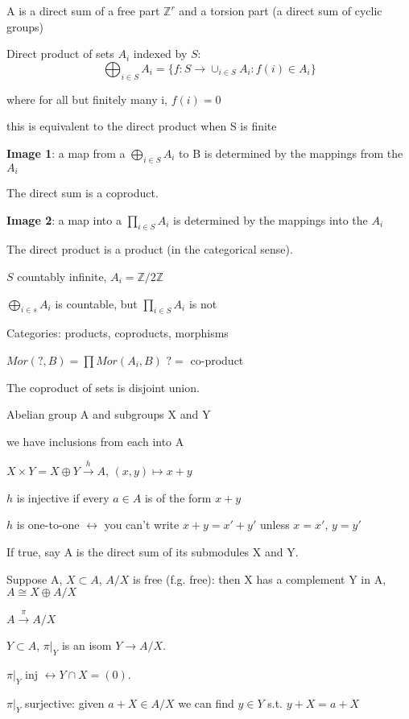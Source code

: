 \documentclass[12pt]{article}
\begin{document}
A is a direct sum of a free part $\mathds{Z}^r$ and a torsion part (a direct sum of cyclic groups)

\noindent
Direct product of sets $A_i$ indexed by $S$: $$\bigoplus_{i \in S}A_i = \{f: S \to \cup_{i \in S}A_i : f(i) \in A_i\}$$

where for all but finitely many i, $f(i) = 0$

this is equivalent to the direct product when S is finite

\noindent
\textbf{Image 1}: a map from a $\bigoplus_{i \in S}A_i$ to B is determined by the mappings from the $A_i$

The direct sum is a coproduct.

\noindent
\textbf{Image 2}: a map into a $\prod_{i \in S}A_i$ is determined by the mappings into the $A_i$

The direct product is a product (in the categorical sense).

\noindent
$S$ countably infinite, $A_i = \mathds{Z}/2\mathds{Z}$

$\bigoplus_{i \in s}A_i$ is countable, but $\prod_{i \in S}A_i$ is not

\noindent
Categories: products, coproducts, morphisms

$Mor(?, B) = \prod Mor(A_i, B)$ $? =$ co-product

The coproduct of sets is disjoint union.

\noindent
Abelian group A and subgroups X and Y

we have inclusions from each into A

$X \times Y = X \oplus Y \xrightarrow{h} A$, $(x, y) \mapsto x + y$

$h$ is injective if every $a \in A$ is of the form $x + y$

$h$ is one-to-one $\leftrightarrow$ you can't write $x + y = x' + y'$ unless $x = x'$, $y = y'$

If true, say A is the direct sum of its submodules X and Y.

\noindent
Suppose A, $X \subset A$, $A/X$ is free (f.g. free): then X has a complement Y in A, $A \cong X \oplus A/X$

$A \xrightarrow{\pi} A/X$

$Y \subset A$, $\pi|_Y$ is an isom $Y \to A/X$.

$\pi|_Y$ inj $\leftrightarrow Y \cap X = (0).$

$\pi|_Y$ surjective: given $a + X \in A/X$ we can find $y \in Y$ s.t. $y + X = a + X$
\end{document}
